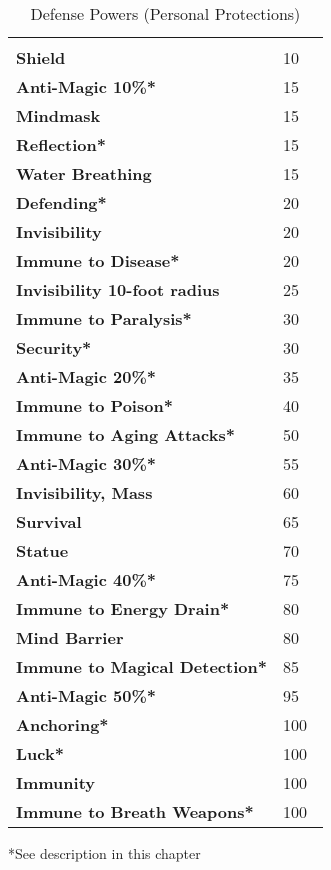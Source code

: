 \begin{multicols*}{2}
\begin {table}[H]
  \caption{Defense Powers (Personal Protections)}
  \begin{tabularx}{\columnwidth}{>{\bfseries}YY}
   & \\
	Shield & 10\\
	Anti-Magic 10\%* & 15\\
	Mindmask & 15\\
	Reflection* & 15\\
	Water Breathing & 15\\
	Defending* & 20\\
	Invisibility & 20\\
	Immune to Disease* & 20\\
	Invisibility 10-foot radius & 25\\
	Immune to Paralysis* & 30\\
	Security* & 30\\
	Anti-Magic 20\%* & 35\\
	Immune to Poison* & 40\\
	Immune to Aging Attacks* & 50\\
	Anti-Magic 30\%* & 55\\
	Invisibility, Mass & 60\\
	Survival & 65\\
	Statue & 70\\
	Anti-Magic 40\%* & 75\\
	Immune to Energy Drain* & 80\\
	Mind Barrier & 80\\
	Immune to Magical Detection* & 85\\
	Anti-Magic 50\%* & 95\\
	Anchoring* & 100\\
	Luck* & 100\\
	Immunity & 100\\
	Immune to Breath Weapons* & 100\
  \end {tabularx}
	*See description in this chapter
\end {table}


\end{multicols*}
